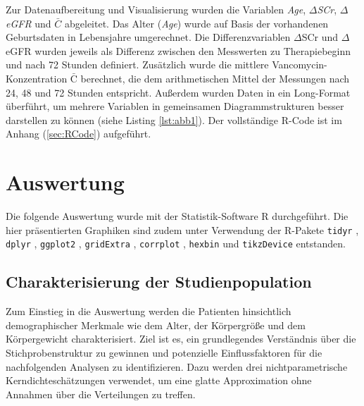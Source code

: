 \documentclass[a4paper,12pt]{article}
\begin{document}
Zur Datenaufbereitung und Visualisierung wurden die Variablen \textit{Age}, \textit{$\Delta$SCr}, \textit{$\Delta$eGFR} und \textit{$\bar{C}$} abgeleitet. Das Alter (\textit{Age}) wurde auf Basis der vorhandenen Geburtsdaten in Lebensjahre umgerechnet. Die Differenzvariablen $\Delta$SCr und $\Delta$eGFR wurden jeweils als Differenz zwischen den Messwerten zu Therapiebeginn und nach 72 Stunden definiert. Zusätzlich wurde die mittlere Vancomycin-Konzentration $\bar{\mathrm{C}}$ berechnet, die dem arithmetischen Mittel der Messungen nach 24, 48 und 72 Stunden entspricht. Außerdem wurden Daten in ein Long-Format überführt, um mehrere Variablen in gemeinsamen Diagrammstrukturen besser darstellen zu können (siehe Listing \ref{lst:abb1}). Der vollständige R-Code ist im Anhang (\ref{sec:RCode}) aufgeführt.  


\section{Auswertung}\label{sec:Auswertung}
Die folgende Auswertung wurde mit der Statistik-Software R \citep{R} durchgeführt. Die hier präsentierten Graphiken sind zudem unter Verwendung der R-Pakete \texttt{tidyr} \citep{tidyr}, \texttt{dplyr} \citep{dplyr}, \texttt{ggplot2} \citep{ggplot2}, \texttt{gridExtra} \citep{gridExtra}, \texttt{corrplot} \citep{corrplot2024}, \texttt{hexbin} \citep{hexbin} und \texttt{tikzDevice} \citep{tikz} entstanden.


\subsection{Charakterisierung der Studienpopulation}\label{sec:CdS}
Zum Einstieg in die Auswertung werden die Patienten hinsichtlich demographischer Merkmale wie dem Alter, der Körpergröße und dem Körpergewicht charakterisiert. Ziel ist es, ein grundlegendes Verständnis über die Stichprobenstruktur zu gewinnen und potenzielle Einflussfaktoren für die nachfolgenden Analysen zu identifizieren. Dazu werden drei nichtparametrische Kerndichteschätzungen verwendet, um eine glatte Approximation ohne Annahmen über die Verteilungen zu treffen.

%
\end{document}
